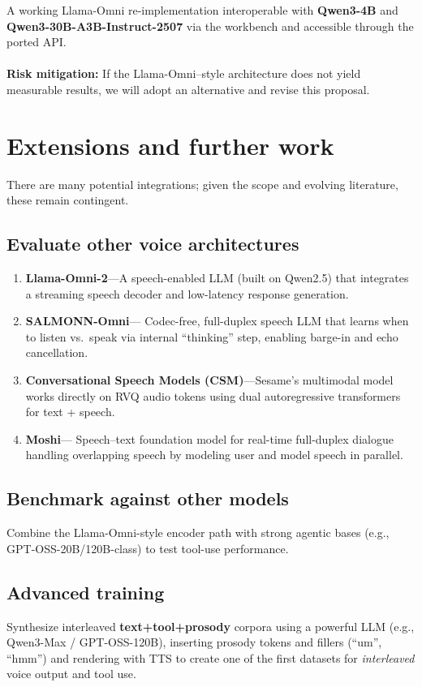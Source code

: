 \documentclass[11pt,a4paper]{scrartcl}
\begin{document}
\begin{successbox}
A working Llama-Omni re-implementation interoperable with \textbf{Qwen3-4B} and \textbf{Qwen3-30B-A3B-Instruct-2507} via the workbench and accessible through the ported API.\\\\
\noindent\textbf{Risk mitigation:} If the Llama-Omni–style architecture does not yield measurable results, we will adopt an alternative and revise this proposal.
\end{successbox}

\section{Extensions and further work}

There are many potential  integrations; given the scope and evolving literature, these remain contingent.

\subsection*{Evaluate other voice architectures}
\begin{enumerate}
  \item \textbf{Llama-Omni-2}—A speech-enabled LLM (built on Qwen2.5) that integrates a streaming speech decoder and low-latency response generation.
  \item \textbf{SALMONN-Omni}— Codec-free, full-duplex speech LLM that learns when to listen vs.\ speak via internal “thinking” step, enabling barge-in and echo cancellation.
  \item \textbf{Conversational Speech Models (CSM)}—Sesame’s multimodal model works directly on RVQ audio tokens using dual autoregressive transformers for text + speech.
  \item \textbf{Moshi}— Speech–text foundation model for real-time full-duplex dialogue handling overlapping speech by modeling user and model speech in parallel.
\end{enumerate}

\subsection*{Benchmark against other models}
Combine the Llama-Omni-style encoder path with strong agentic bases (e.g., GPT-OSS-20B/120B-class) to test tool-use performance.

\subsection*{Advanced training}
Synthesize interleaved \textbf{text+tool+prosody} corpora using a powerful LLM (e.g., Qwen3-Max / GPT-OSS-120B), inserting prosody tokens and fillers (“um”, “hmm”) and rendering with TTS to create one of the first datasets for \emph{interleaved} voice output and tool use.
\end{document}
